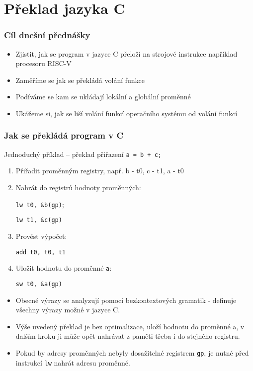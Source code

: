 \documentclass{beamer}
\subtitle{Lekce 10. Překlad jazyka C}
\author{Pavel Píša \phantom{xxxxxxxxx} Petr Štěpán \\ \small\texttt{pisa@fel.cvut.cz}\phantom{xxxx}\small\texttt{stepan@fel.cvut.cz}}
\begin{document}
\maketitle

\section{Překlad jazyka C}

\begin{frame}
\frametitle{Cíl dnešní přednášky}

\begin{itemize}
 \item Zjistit, jak se program v jazyce C přeloží na strojové instrukce například procesoru RISC-V
 \item Zaměříme se jak se překládá volání funkce
 \item Podíváme se kam se ukládají lokální a globální proměnné
 \item Ukážeme si, jak se liší volání funkcí operačního systému od volání funkcí
\end{itemize}
\end{frame}


\begin{frame}
\frametitle{Jak se překládá program v C}

Jednoduchý příklad -- překlad přiřazení \texttt{a = b + c;}
\begin{enumerate}
 \item Přiřadit proměnným registry, např. b - t0, c - t1, a - t0
 \item Nahrát do registrů hodnoty proměnných: 
 
 \texttt{lw t0, \&b(gp)}; 
 
 \texttt{lw t1, \&c(gp)}
 \item Provést výpočet: 
 
 \texttt{add t0, t0, t1}
 \item Uložit hodnotu do proměnné \texttt{a}: 
 
 \texttt{sw t0, \&a(gp)} 
\end{enumerate}

\bigskip

\begin{itemize}
 \item Obecné výrazy se analyzují pomocí bezkontextových gramatik - definuje všechny výrazy možné v jazyce C.
 \item Výše uvedený překlad je bez optimalizace, uloží hodnotu do proměnné a, v dalším kroku ji může opět nahrávat z paměti třeba i do stejného registru. 
 \item Pokud by adresy proměnných nebyly dosažitelné registrem \texttt{gp}, je nutné před instrukcí \texttt{lw} nahrát adresu proměnné.
\end{itemize}

\end{frame}
\end{document}
